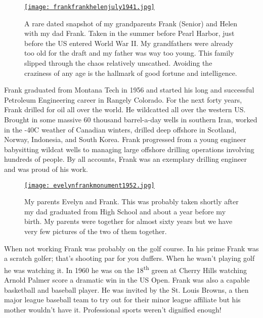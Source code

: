 \begin{SCfigure}[50]
\centering
\href{https://conceptcontrol.smugmug.com/People/The-Way-We-Were/i-SXfn4nQ/A}{\texttt{[image: frankfrankhelenjuly1941.jpg]}}
\caption[A rare dated snapshot of my grandparents Frank (Senior) and
Helen with my dad Frank.]{A rare dated snapshot of my grandparents Frank (Senior) and
Helen with my dad Frank. Taken in the summer before Pearl Harbor, just
before the US entered World War II. My grandfathers were already too old
for the draft and my father was way too young. This family slipped
through the chaos relatively unscathed. Avoiding the craziness of any
age is the hallmark of good fortune and intelligence.}
\label{fig:7074x1}
\end{SCfigure}

Frank graduated from Montana Tech in 1956 and started his long and
successful Petroleum Engineering career in Rangely Colorado. For the
next forty years, Frank drilled for oil all over the world. He
wildcatted all over the western US. Brought in some massive 60 thousand
barrel-a-day wells in southern Iran, worked in the -40C weather of
Canadian winters, drilled deep offshore in Scotland, Norway, Indonesia,
and South Korea. Frank progressed from a young engineer babysitting
wildcat wells to managing large offshore drilling operations involving
hundreds of people. By all accounts, Frank was an exemplary drilling
engineer and was proud of his work.

\begin{SCfigure}[50]
\centering
\href{https://conceptcontrol.smugmug.com/People/The-Way-We-Were/i-Z5FBnXx/A}{\texttt{[image: evelynfrankmonument1952.jpg]}}
\caption[My parents Evelyn and Frank.]{My parents Evelyn and Frank. This was probably taken shortly
after my dad graduated from High School and about a year before my
birth. My parents were together for almost sixty years but we have very
few pictures of the two of them together.}
\label{fig:7074x2}
\end{SCfigure}

When not working Frank was probably on the golf course. In his prime
Frank was a scratch golfer; that's shooting par for you duffers. When he
wasn't playing golf he was watching it. In 1960 he was on the
18\textsuperscript{th} green at Cherry Hills watching Arnold Palmer
score a dramatic win in the US Open. Frank was also a capable basketball
and baseball player. He was invited by the St. Louis Browns, a then
major league baseball team to try out for their minor league affiliate
but his mother wouldn't have it. Professional sports weren't dignified
enough!

